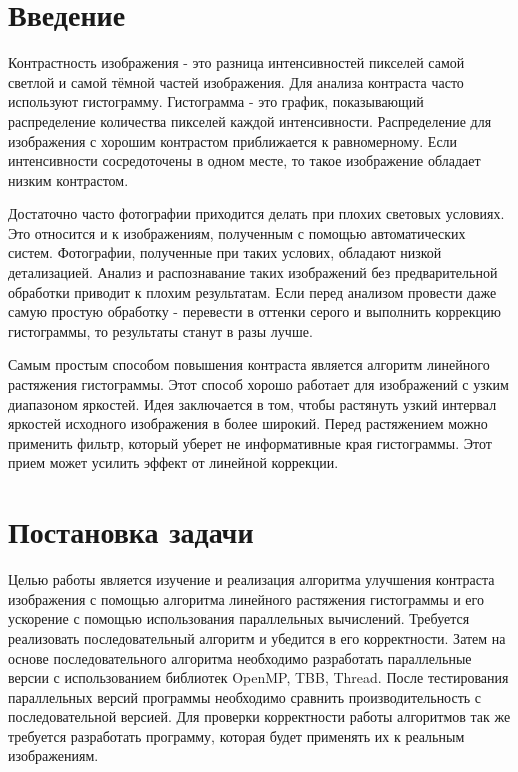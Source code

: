 \documentclass{report}
\begin{document}
	\tableofcontents

	\newpage
	

	\section*{Введение}
	\par Контрастность изображения - это разница интенсивностей пикселей самой светлой и самой тёмной частей изображения. Для анализа контраста часто используют гистограмму. Гистограмма - это график, показывающий распределение количества пикселей каждой интенсивности. Распределение для изображения с хорошим контрастом приближается к равномерному. Если интенсивности сосредоточены в одном месте, то такое изображение обладает низким контрастом.
	
	\par Достаточно часто фотографии приходится делать при плохих световых условиях. Это относится и к изображениям, полученным с помощью автоматических систем. Фотографии, полученные при таких услових, обладают низкой детализацией. Анализ и распознавание таких изображений без предварительной обработки приводит к плохим результатам. Если перед анализом провести даже самую простую обработку - перевести в оттенки серого и выполнить коррекцию гистограммы, то результаты станут в разы лучше.
	
	\par Самым простым способом повышения контраста является алгоритм линейного растяжения гистограммы. Этот способ хорошо работает для изображений с узким диапазоном яркостей. Идея заключается в том, чтобы растянуть узкий интервал яркостей исходного изображения в более широкий. Перед растяжением можно применить фильтр, который уберет не информативные края гистограммы. Этот прием может усилить эффект от линейной коррекции.
	
	\newpage
    \section*{Постановка задачи}
    \par Целью работы является изучение и реализация алгоритма улучшения контраста изображения с помощью алгоритма линейного растяжения гистограммы и его ускорение с помощью использования параллельных вычислений. Требуется реализовать последовательный алгоритм и убедится в его корректности. Затем на основе последовательного алгоритма необходимо разработать параллельные версии с использованием библиотек OpenMP, TBB, Thread. После тестирования параллельных версий программы необходимо сравнить производительность с последовательной версией. Для проверки корректности работы алгоритмов так же требуется разработать программу, которая будет применять их к реальным изображениям.
    
\end{document}
